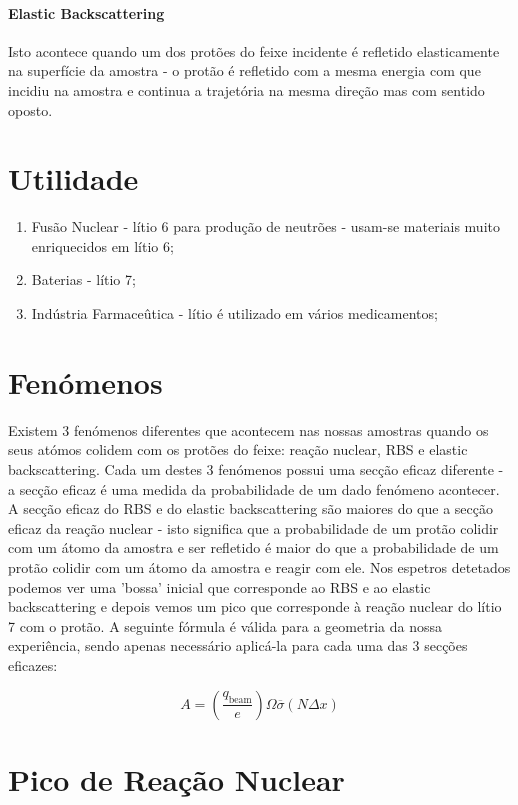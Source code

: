 \documentclass{article}
\begin{document}
\begin{multicols}{2}
\paragraph*{Elastic Backscattering} Isto acontece quando um dos protões do feixe incidente é refletido elasticamente na superfície da amostra - o protão é refletido com a mesma energia com que incidiu na amostra e continua a trajetória na mesma direção mas com sentido oposto.

\section{Utilidade}

\begin{enumerate}
  \item Fusão Nuclear - lítio 6 para produção de neutrões -  usam-se materiais muito enriquecidos em lítio 6;
  \item Baterias - lítio 7;
  \item Indústria Farmaceûtica - lítio é utilizado em vários medicamentos;
\end{enumerate}

\section{Fenómenos}

Existem 3 fenómenos diferentes que acontecem nas nossas amostras quando os seus atómos colidem com os protões do feixe: reação nuclear, RBS e elastic backscattering.
Cada um destes 3 fenómenos possui uma secção eficaz diferente - a secção eficaz é uma medida da probabilidade de um dado fenómeno acontecer.
A secção eficaz do RBS e do elastic backscattering são maiores do que a secção eficaz da reação nuclear - isto significa que a probabilidade de um protão colidir com um átomo da amostra e ser refletido é maior do que a probabilidade de um protão colidir com um átomo da amostra e reagir com ele.
Nos espetros detetados podemos ver uma 'bossa' inicial que corresponde ao RBS e ao elastic backscattering e depois vemos um pico que corresponde à reação nuclear do lítio 7 com o protão.
A seguinte fórmula é válida para a geometria da nossa experiência, sendo apenas necessário aplicá-la para cada uma das 3 secções eficazes:

\[ A = \left( \frac{q_{\text{beam}}}{e} \right) \Omega \overline{\sigma} (N \Delta x) \]

\section{Pico de Reação Nuclear}


\end{multicols}
\end{document}

